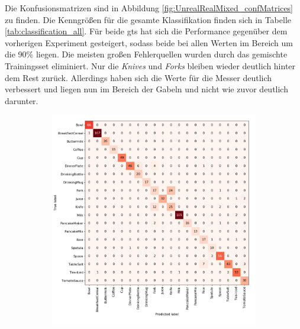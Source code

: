 Die Konfusionsmatrizen sind in Abbildung \ref{fig:UnrealRealMixed_confMatrices} zu finden. Die Kenngrößen für die gesamte Klassifikation finden sich in Tabelle \ref{tab:classification_all}. Für beide \gls{gt}s hat sich die Performance gegenüber dem vorherigen Experiment gesteigert, sodass beide bei allen Werten im Bereich um die 90\% liegen. Die meisten großen Fehlerquellen wurden durch das gemischte Trainingsset eliminiert. Nur die \textit{Knives} und \textit{Forks} bleiben wieder deutlich hinter dem Rest zurück. Allerdings haben sich die Werte für die Messer deutlich verbessert und liegen nun im Bereich der Gabeln und nicht wie zuvor deutlich darunter.  \par 

\begin{figure}
\centering
	\begin{subfigure}[b]{1\textwidth}
	\centering
	\includegraphics[scale=.29]{img/chapter6/UnrealRealMixedGTClass.png}
	\end{subfigure}
	\begin{subfigure}[b]{1\textwidth}
	\centering

\end{subfigure}
\end{figure}
